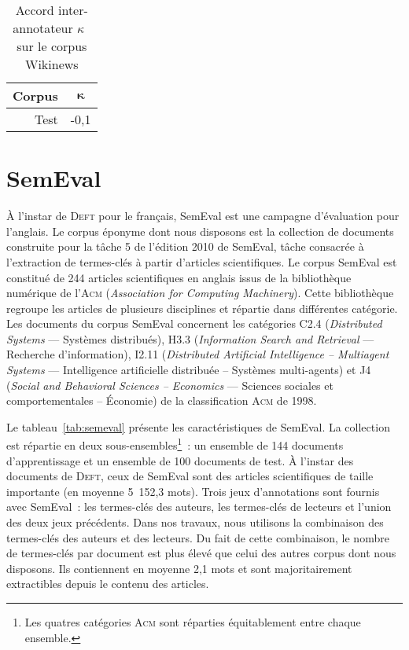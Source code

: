     \begin{table}[!h]
      \centering
      \begin{tabular}{r|c}
        \toprule
        \textbf{Corpus} & $\boldsymbol{\kappa}$\\
        \hline
        Test & -0,1\\
        \bottomrule
      \end{tabular}

      \caption{Accord inter-annotateur $\kappa$~\cite{fleiss1971kappa} sur le
               corpus Wikinews
               \label{tab:wikinews_kappa}}
    \end{table}


  \section[SemEval]{SemEval~\textnormal{\large\cite{kim2010semeval}}}
  \label{sec:main-data_description-semeval_data}
    À l'instar de \textsc{Deft} pour le français, SemEval est une campagne
    d'évaluation pour l'anglais. Le corpus éponyme dont nous disposons est la
    collection de documents construite pour la tâche 5 de l'édition 2010 de
    SemEval, tâche consacrée à l'extraction de termes-clés à partir d'articles
    scientifiques. Le corpus SemEval est constitué de 244 articles scientifiques
    en anglais issus de la bibliothèque numérique de l'\textsc{Acm}
    (\textit{Association for Computing Machinery}). Cette bibliothèque regroupe
    les articles de plusieurs disciplines et répartie dans différentes
    catégorie. Les documents du corpus SemEval concernent les catégories C2.4
    (\textit{Distributed Systems} --- Systèmes distribués), H3.3
    (\textit{Information Search and Retrieval} --- Recherche d'information),
    I2.11 (\textit{Distributed Artificial Intelligence -- Multiagent Systems}
    --- Intelligence artificielle distribuée -- Systèmes multi-agents) et J4
    (\textit{Social and Behavioral Sciences -- Economics} --- Sciences sociales
    et comportementales -- Économie) de la classification \textsc{Acm} de 1998.
    
    Le tableau~\ref{tab:semeval} présente les caractéristiques de SemEval. La
    collection est répartie en deux sous-ensembles\footnote{Les quatres
    catégories \textsc{Acm} sont réparties équitablement entre chaque
    ensemble.}~: un ensemble de 144 documents d'apprentissage et un ensemble de
    100 documents de test. À l'instar des documents de \textsc{Deft}, ceux de
    SemEval sont des articles scientifiques de taille importante (en moyenne
    5~152,3 mots). Trois jeux d'annotations sont fournis avec SemEval~: les
    termes-clés des auteurs, les termes-clés de lecteurs et l'union des deux
    jeux précédents. Dans nos travaux, nous utilisons la combinaison des
    termes-clés des auteurs et des lecteurs. Du fait de cette combinaison, le
    nombre de termes-clés par document est plus élevé que celui des autres
    corpus dont nous disposons. Ils contiennent en moyenne 2,1 mots et sont
    majoritairement extractibles depuis le contenu des articles.

